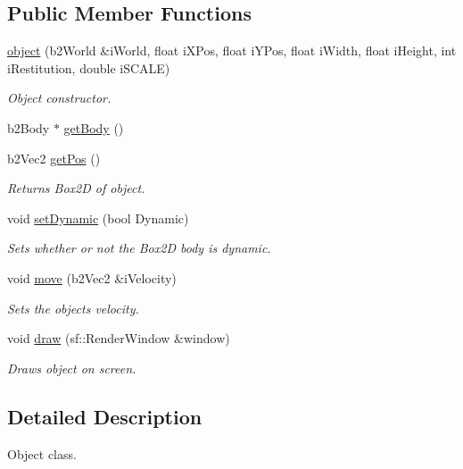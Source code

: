 \subsection*{Public Member Functions}
\begin{DoxyCompactItemize}
\item 
\hyperlink{classobject_a6444f1addfcba46e8a38e3a10afc5b55}{object} (b2\+World \&i\+World, float i\+X\+Pos, float i\+Y\+Pos, float i\+Width, float i\+Height, int i\+Restitution, double i\+S\+C\+A\+LE)
\begin{DoxyCompactList}\small\item\em Object constructor. \end{DoxyCompactList}\item 
b2\+Body $\ast$ \hyperlink{classobject_ae2e614e0e6af97805323193da7a1e7ff}{get\+Body} ()
\item 
b2\+Vec2 \hyperlink{classobject_a505665c0df5c44d5dfc77881fe5d95a4}{get\+Pos} ()
\begin{DoxyCompactList}\small\item\em Returns Box2D of object. \end{DoxyCompactList}\item 
void \hyperlink{classobject_a872e3c1ff75e786a58389852aad28a65}{set\+Dynamic} (bool Dynamic)
\begin{DoxyCompactList}\small\item\em Sets whether or not the Box2D body is dynamic. \end{DoxyCompactList}\item 
void \hyperlink{classobject_a74da589c4536cacfd76fa230a4dbee9e}{move} (b2\+Vec2 \&i\+Velocity)
\begin{DoxyCompactList}\small\item\em Sets the object\textquotesingle{}s velocity. \end{DoxyCompactList}\item 
void \hyperlink{classobject_a844b4128957b29e24370efe2d2cb3dca}{draw} (sf\+::\+Render\+Window \&window)
\begin{DoxyCompactList}\small\item\em Draws object on screen. \end{DoxyCompactList}\end{DoxyCompactItemize}


\subsection{Detailed Description}
Object class. 

